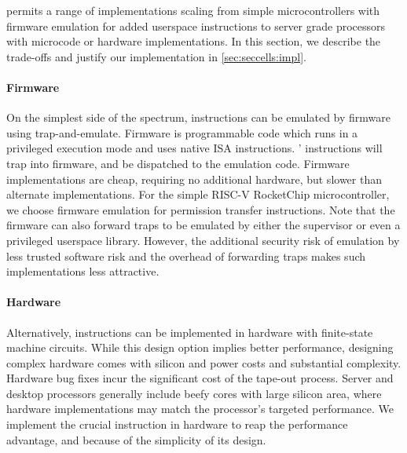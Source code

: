 \seccells permits a range of implementations scaling from simple 
microcontrollers with firmware emulation for added userspace
instructions to server grade processors with microcode or hardware 
implementations. In this section, we describe the trade-offs and 
justify our implementation in \autoref{sec:seccells:impl}.

\paragraph{Firmware}
On the simplest side of the spectrum, instructions can be emulated
by firmware using trap-and-emulate.
Firmware is programmable code which runs in a privileged execution mode 
and uses native ISA instructions.
\seccells' instructions will trap into firmware, and be dispatched to 
the emulation code.
Firmware implementations are cheap, requiring no additional hardware, but 
slower than alternate implementations.
For the simple RISC-V RocketChip microcontroller, we choose 
firmware emulation for permission transfer instructions.
Note that the firmware can also forward traps to be emulated by
either the supervisor or even a privileged userspace library.
However, the additional security risk of emulation by less trusted
software risk and the overhead of forwarding traps makes such
implementations less attractive.

\paragraph{Hardware}
Alternatively, instructions can be implemented in hardware with 
finite-state machine circuits.
While this design option implies better performance,
designing complex hardware comes with silicon and power costs and
substantial complexity.
Hardware bug fixes incur the significant cost of the tape-out process.
Server and desktop processors generally include beefy cores with
large silicon area, where hardware implementations may match the
processor's targeted performance.
We implement the crucial \sdswitch instruction in hardware
to reap the performance advantage,
and because of the simplicity of its design.

